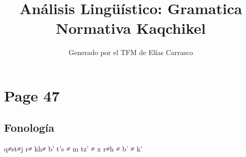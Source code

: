 \documentclass{article}%
\title{Análisis Lingüístico: Gramatica Normativa Kaqchikel}%
\author{Generado por el TFM de Elías Carrasco}%
\begin{document}
%
\normalsize%
\maketitle%
\section{Page 47}%
\label{sec:Page47}%
\subsection{Fonología}%
\label{subsec:Fonologa}%

%
q≠st≠j %
r≠ kh≠ b' %
t's ≠ m %
tz' ≠ x r≠h ≠ b' ≠ k' 

%
\end{document}
